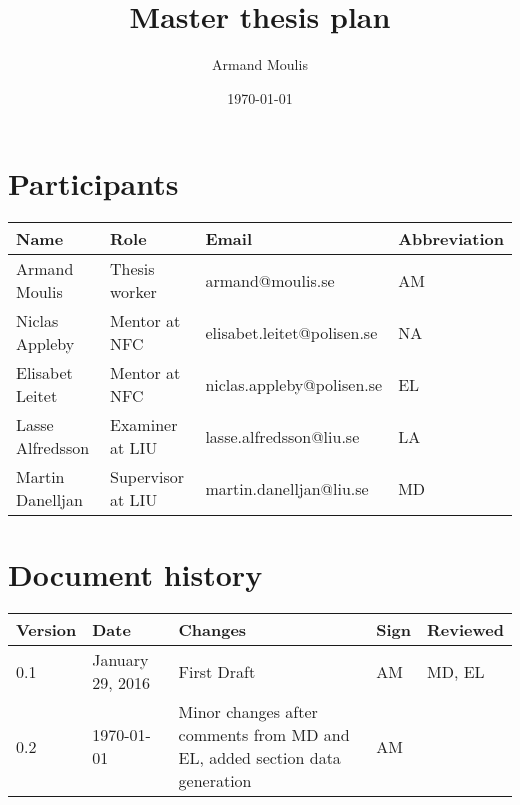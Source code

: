 \documentclass{article}
\begin{document}
	



\title{Master thesis plan}
\author{Armand Moulis}
\date{\today}
\maketitle
\newpage

\section*{Participants}

\begin{center}

	\begin{tabular}{|l|l|l|l|}
		\hline
		Name             & Role            & Email                      & Abbreviation \\ \hline
		Armand Moulis    & Thesis worker   & armand@moulis.se           & AM           \\ \hline
		Niclas Appleby   & Mentor at NFC   & elisabet.leitet@polisen.se & NA           \\ \hline
		Elisabet Leitet  & Mentor at NFC   & niclas.appleby@polisen.se  & EL           \\ \hline
		Lasse Alfredsson & Examiner at LIU & lasse.alfredsson@liu.se    & LA           \\ \hline
		Martin Danelljan & Supervisor at LIU   & martin.danelljan@liu.se    & MD           \\ \hline
	\end{tabular}
\end{center}
\newpage


\newpage
\setcounter{tocdepth}{3}
\tableofcontents
\newpage

\section*{Document history}
\begin{center}
	\begin{tabular}{|l|l| p{5cm} |l|l| }
		\hline
		Version &  Date  & Changes     & Sign & Reviewed \\ \hline
		  0.1   & January 29, 2016 & First Draft & AM  & MD, EL \\ \hline
		  0.2   & \today & Minor changes after comments from MD and EL, added section data generation & AM  &  \\ \hline
	\end{tabular}
\end{center}
\newpage
\end{document}
